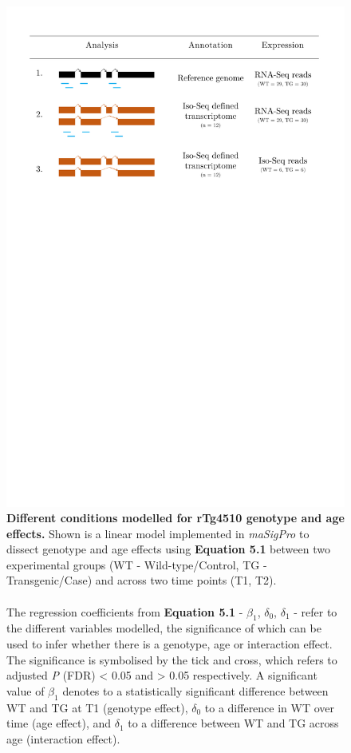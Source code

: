 \begin{figure}[!htp]
	\centering
	\includegraphics[page=2,trim={0 5cm 0 4cm},scale = 0.45]{Figures/Tg4510_diff_figures.pdf}
	\captionsetup{width=0.95\textwidth}
	\caption[Different conditions modelled for rTg4510 genotype and age effects]%
	{\textbf{Different conditions modelled for rTg4510 genotype and age effects.} Shown is a linear model implemented in \textit{maSigPro} to dissect genotype and age effects using \textbf{Equation 5.1} between two experimental groups (WT - Wild-type/Control, TG - Transgenic/Case) and across two time points (T1, T2). 
	\\\\
	The regression coefficients from \textbf{Equation 5.1} - $\beta_{1}$, $\delta_{0}$, $\delta_{1}$ - refer to the different variables modelled, the significance of which can be used to infer whether there is a genotype, age or interaction effect. The significance is symbolised by the tick and cross, which refers to adjusted \textit{P} (FDR) < 0.05 and > 0.05 respectively. A significant value of $\beta_{1}$ denotes to a statistically significant difference between WT and TG at T1 (genotype effect), $\delta_{0}$ to a difference in WT over time (age effect), and $\delta_{1}$ to a difference between WT and TG across age (interaction effect).}   
	\label{fig:dea_model}
\end{figure}

